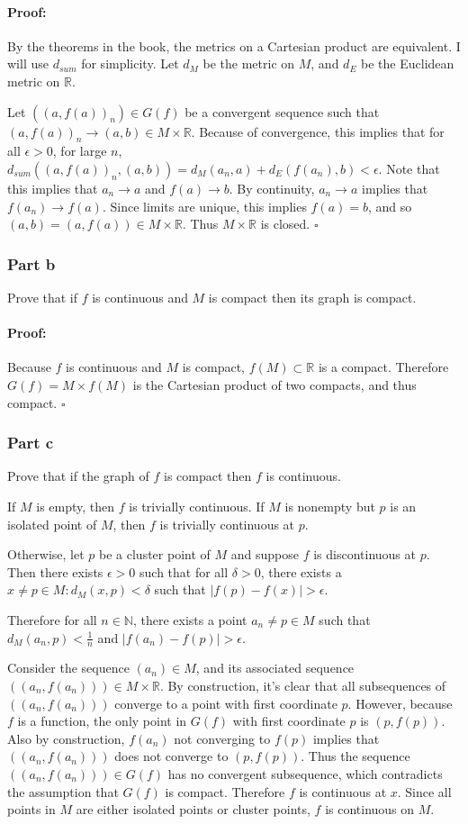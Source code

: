 \documentclass{article}
\newenvironment{proof}{\paragraph{Proof:}}{\hfill$\square$}
\begin{document}
\begin{proof}
By the theorems in the book, the metrics on a Cartesian product are equivalent. I will use $d_{sum}$ for simplicity. Let $d_M$ be the metric on $M$, and $d_E$ be the Euclidean metric on $\mathbb{R}$.

Let $((a, f(a))_n) \in G(f)$ be a convergent sequence such that $(a, f(a))_n \rightarrow (a, b) \in M \times \mathbb{R}$. Because of convergence, this implies that for all $\epsilon > 0$, for large $n$, $d_{sum}((a, f(a))_n, (a, b)) = d_M(a_n, a) + d_E(f(a_n), b) < \epsilon$. Note that this implies that $a_n \rightarrow a$ and $f(a) \rightarrow b$. By continuity, $a_n \rightarrow a$ implies that $f(a_n) \rightarrow f(a)$. Since limits are unique, this implies $f(a) = b$, and so $(a, b) = (a, f(a)) \in M \times \mathbb{R}$. Thus $M \times \mathbb{R}$ is closed.
\end{proof}

\subsubsection*{Part b}
Prove that if $f$ is continuous and $M$ is compact then its graph is compact.

\begin{proof}
Because $f$ is continuous and $M$ is compact, $f(M) \subset \mathbb{R}$ is a compact. Therefore $G(f) = M \times f(M)$ is the Cartesian product of two compacts, and thus compact.
\end{proof}

\subsubsection*{Part c}
Prove that if the graph of $f$ is compact then $f$ is continuous.

If $M$ is empty, then $f$ is trivially continuous. If $M$ is nonempty but $p$ is an isolated point of $M$, then $f$ is trivially continuous at $p$.

Otherwise, let $p$ be a cluster point of $M$ and suppose $f$ is discontinuous at $p$. Then there exists $\epsilon > 0$ such that for all $\delta > 0$, there exists a $x \neq p \in M : d_M(x, p) < \delta$ such that $|f(p) - f(x)| > \epsilon$. 

Therefore for all $n \in \mathbb{N}$, there exists a point $a_n \neq p \in M$ such that $d_M(a_n, p) < \frac{1}{n}$ and $|f(a_n) - f(p)| > \epsilon$.

Consider the sequence $(a_n) \in M$, and its associated sequence $((a_n, f(a_n))) \in M \times \mathbb{R}$. By construction, it's clear that all subsequences of $((a_n, f(a_n)))$ converge to a point with first coordinate $p$. However, because $f$ is a function, the only point in $G(f)$ with first coordinate $p$ is $(p, f(p))$. Also by construction, $f(a_n)$ not converging to $f(p)$ implies that $((a_n, f(a_n)))$ does not converge to $(p, f(p))$. Thus the sequence $((a_n, f(a_n))) \in G(f)$ has no convergent subsequence, which contradicts the assumption that $G(f)$ is compact. Therefore $f$ is continuous at $x$. Since all points in $M$ are either isolated points or cluster points, $f$ is continuous on $M$.
\end{document}
